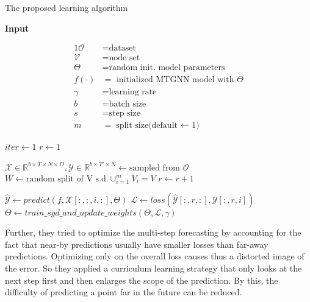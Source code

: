 \documentclass[letterpaper, twocolumn,11pt]{article}
\begin{document}
    \begin{algorithm}
        \scriptsize
        \caption{The proposed learning algorithm}\label{learning}
        \textbf{Input}

        \begin{alignat*}{1}
            \mathcal{O} &= \text{dataset} \\
            \mathcal{V} &= \text{node set} \\
            \Theta &= \text{random init. model parameters} \\
            f(\cdot) &= \text{ initialized MTGNN model with } \Theta  \\
            \gamma &= \text{learning rate} \\
            b &= \text{batch size} \\
            s &= \text{step size} \\
            m &= \text{split size(default $\gets$ 1)}
        \end{alignat*}

        \begin{algorithmic}[1]
            \State $iter \gets 1$
            \State $r \gets 1$

            \Repeat
                \State $\mathcal{X} \in \mathbb{R}^{b \times T \times N \times D},\mathcal{Y} \in \mathbb{R}^{b \times T' \times N} \gets \text{sampled from }\mathcal{O}$
                \State $W \gets \text{random split of V s.d.} \cup_{i=1}^m V_i = V $
                    \State $r \gets r+1$
                \EndIf

                    \State $\hat{\mathcal{Y}} \gets predict(f, \mathcal{X}[:,:,i,:], \Theta)$
                    \State $\mathcal{L} \gets loss(\hat{\mathcal{Y}}[:,r,:], \mathcal{Y}[:,r,i])$
                    \State $\Theta \gets train\_sgd\_and\_update\_weights(\Theta,\mathcal{L}, \gamma)$
                \EndFor
        \end{algorithmic}
    \end{algorithm}

    Further, they tried to optimize the multi-step forecasting by accounting for the fact that near-by predictions usually have smaller losses than far-away predictions.
    Optimizing only on the overall loss causes thus a distorted image of the error.
    So they applied a curriculum learning strategy that only looks at the next step first and then enlarges the scope of the prediction.
    By this, the difficulty of predicting a point far in the future can be reduced.
\end{document}
